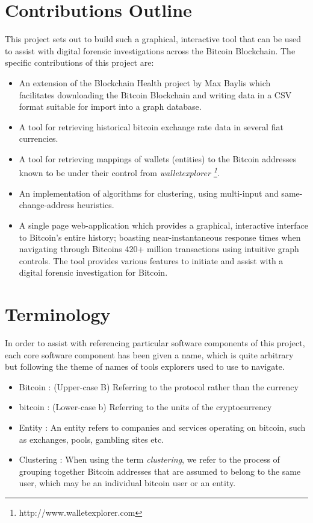 \section{Contributions Outline}
This project sets out to build such a graphical, interactive tool that can be used to assist with digital forensic investigations across the Bitcoin Blockchain. The specific contributions of this project are:
\begin{itemize}
    \item An extension of the Blockchain Health project by Max Baylis which facilitates downloading the Bitcoin Blockchain and writing data in a CSV format suitable for import into a graph database.
    \item A tool for retrieving historical bitcoin exchange rate data in several fiat currencies.
    \item A tool for retrieving mappings of wallets (entities) to the Bitcoin addresses known to be under their control from \textit{walletexplorer \footnote{http://www.walletexplorer.com}}.
    \item An implementation of algorithms for clustering, using multi-input and same-change-address heuristics.
    \item A single page web-application which provides a graphical, interactive interface to Bitcoin's entire history; boasting near-instantaneous response times when navigating through Bitcoins 420+ million transactions \cite{RefWorks:doc:5cfba9cde4b0b8ab9a52e35c} using intuitive graph controls. The tool provides various features to initiate and assist with a digital forensic investigation for Bitcoin.
\end{itemize}


\section{Terminology}
In order to assist with referencing particular software components of this project, each core software component has been given a name, which is quite arbitrary but following the theme of names of tools explorers used to use to navigate.

 \begin{itemize}
    \item Bitcoin : (Upper-case B) Referring to the protocol rather than the currency
    \item bitcoin : (Lower-case b) Referring to the units of the cryptocurrency
    \item Entity : An entity refers to companies and services operating on bitcoin, such as exchanges, pools, gambling sites etc. 
    \item Clustering : When using the term \textit{clustering}, we refer to the process of grouping together Bitcoin addresses that are assumed to belong to the same user, which may be an individual bitcoin user or an entity. 
 \end{itemize}